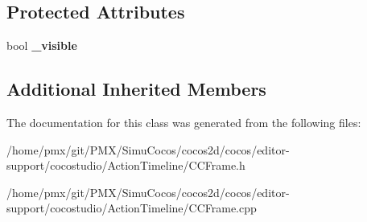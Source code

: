 \subsection*{Protected Attributes}
\begin{DoxyCompactItemize}
\item 
\mbox{\label{classVisibleFrame_a8a2ba31da1a017ca510f0f447ef7c535}} 
bool {\bfseries \+\_\+visible}
\end{DoxyCompactItemize}
\subsection*{Additional Inherited Members}


The documentation for this class was generated from the following files\+:\begin{DoxyCompactItemize}
\item 
/home/pmx/git/\+P\+M\+X/\+Simu\+Cocos/cocos2d/cocos/editor-\/support/cocostudio/\+Action\+Timeline/C\+C\+Frame.\+h\item 
/home/pmx/git/\+P\+M\+X/\+Simu\+Cocos/cocos2d/cocos/editor-\/support/cocostudio/\+Action\+Timeline/C\+C\+Frame.\+cpp\end{DoxyCompactItemize}
